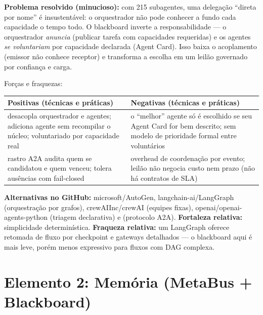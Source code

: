 
\begin{funcao}
\textbf{Problema resolvido (minucioso):} com 215 subagentes, uma delegação
``direta por nome'' é insustentável: o orquestrador não pode conhecer a fundo cada
capacidade o tempo todo. O blackboard inverte a responsabilidade — o orquestrador
\emph{anuncia} (publicar tarefa com capacidades requeridas) e os agentes
\emph{se voluntariam} por capacidade declarada (Agent Card). Isso baixa o
acoplamento (emissor não conhece receptor) e transforma a escolha em um leilão
governado por confiança e carga.
\end{funcao}

\begin{resultado}
Forças e fraquezas:\par
\smallskip
{\footnotesize
\begin{tabularx}{\linewidth}{YY}
\toprule
Positivas (técnicas e práticas) & Negativas (técnicas e práticas) \\
\midrule
desacopla orquestrador e agentes; adiciona agente sem recompilar o núcleo;
voluntariado por capacidade real & o ``melhor'' agente só é escolhido se seu
Agent Card for bem descrito; sem modelo de prioridade formal entre voluntários \\
rastro A2A audita quem se candidatou e quem venceu; tolera ausências com
fail-closed & overhead de coordenação por evento; leilão não negocia custo nem
prazo (não há contratos de SLA) \\
\bottomrule
\end{tabularx}\par}
\end{resultado}

\begin{metodo}
\textbf{Alternativas no GitHub:} microsoft/AutoGen, langchain-ai/LangGraph
(orquestração por grafos), crewAIInc/crewAI (equipes fixas),
openai/openai-agents-python (triagem declarativa) e 
(protocolo A2A). \textbf{Fortaleza relativa:} simplicidade determinística.
\textbf{Fraqueza relativa:} um LangGraph oferece retomada de fluxo por
checkpoint e gateways detalhados — o blackboard aqui é mais leve, porém menos
expressivo para fluxos com DAG complexa.
\end{metodo}

\clearpage
\section{Elemento 2: Memória (MetaBus + Blackboard)}

